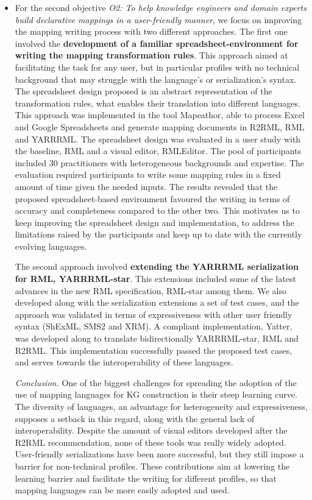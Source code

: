 \begin{itemize}
    \item For the second objective \textit{O2: To help knowledge engineers and domain experts build declarative mappings in a user-friendly manner}, we focus on improving the mapping writing process with two different approaches. 
    The first one involved the \textbf{development of a familiar spreadsheet-environment for writing the mapping transformation rules}. 
    This approach aimed at facilitating the task for any user, but in particular profiles with no technical background that may struggle with the language's or serialization's syntax. 
    The spreadsheet design proposed is an abstract representation of the transformation rules, what enables their translation into different languages. 
    This approach was implemented in the tool Mapeathor, able to process Excel and Google Spreadsheets and generate mapping documents in R2RML, RML and YARRRML. 
    The spreadsheet design was evaluated in a user study with the baseline, RML and a visual editor, RMLEditor. 
    The pool of participants included 30 practitioners with heterogeneous backgrounds and expertise.
    The evaluation required participants to write some mapping rules in a fixed amount of time given the needed inputs. 
    The results revealed that the proposed spreadsheet-based environment favoured the writing in terms of accuracy and completeness compared to the other two.
    This motivates us to keep improving the spreadsheet design and implementation, to address the limitations raised by the participants and keep up to date with the currently evolving languages. 
    
    The second approach involved \textbf{extending the YARRRML serialization for RML, YARRRML-star}. 
    This extensions included some of the latest advances in the new RML specification, RML-star among them. 
    We also developed along with the serialization extensions a set of test cases, and the approach was validated in terms of expressiveness with other user friendly syntax (ShExML, SMS2 and XRM). 
    A compliant implementation, Yatter, was developed along to translate bidirectionally YARRRML-star, RML and R2RML. 
    This implementation successfully passed the proposed test cases, and serves towards the interoperability of these languages.
    
    \textit{Conclusion.} One of the biggest challenges for spreading the adoption of the use of mapping languages for KG construction is their steep learning curve. The diversity of languages, an advantage for heterogeneity and expressiveness, supposes a setback in this regard, along with the general lack of interoperability. Despite the amount of visual editors developed after the R2RML recommendation, none of these tools was really widely adopted. User-friendly serializations have been more successful, but they still impose a barrier for non-technical profiles. These contributions aim at lowering the learning barrier and facilitate the writing for different profiles, so that mapping languages can be more easily adopted and used. 
\end{itemize}


